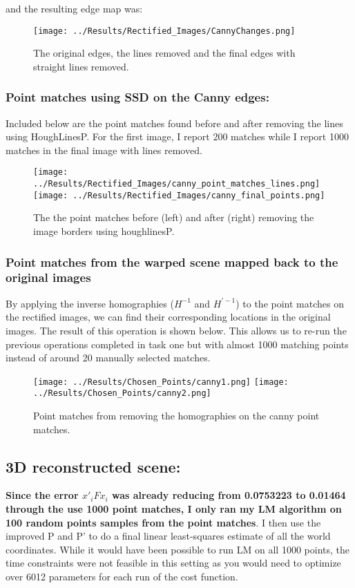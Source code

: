 \documentclass{article}
\begin{document}
and the resulting edge map was:
\begin{figure}[H]
    \centering
    \texttt{[image: ../Results/Rectified\_Images/CannyChanges.png]}
    \caption{The original edges, the lines removed and the final edges with straight lines removed.}
\end{figure}

\subsubsection{Point matches using SSD on the Canny edges:}
Included below are the point matches found before and after removing the lines using HoughLinesP. For the first image, I report 200 matches while I report 1000 matches in the final image with lines removed.
\begin{figure}[H]
    \centering
    \texttt{[image: ../Results/Rectified\_Images/canny\_point\_matches\_lines.png]}
    \texttt{[image: ../Results/Rectified\_Images/canny\_final\_points.png]}
    \caption{The the point matches before (left) and after (right) removing the image borders using houghlinesP.}
\end{figure}

\subsubsection{Point matches from the warped scene mapped back to the original images}
By applying the inverse homographies ($H^{-1}$ and $H^{'-1}$) to the point matches on the rectified images, we can find their corresponding locations in the original images. The result of this operation is shown below. This allows us to re-run the previous operations completed in task one but with almost 1000 matching points instead of around 20 manually selected matches.

\begin{figure}[H]
    \centering
    \texttt{[image: ../Results/Chosen\_Points/canny1.png]}
    \texttt{[image: ../Results/Chosen\_Points/canny2.png]}
    \caption{Point matches from removing the homographies on the canny point matches.}
\end{figure}

\subsection{3D reconstructed scene:}
\textbf{Since the error $x'_i F x_i$ was already reducing from 0.0753223 to 0.01464 through the use 1000 point matches, I only ran my LM algorithm on 100 random points samples from the point matches}. I then use the improved P and P' to do a final linear least-squares estimate of all the world coordinates. While it would have been possible to run LM on all 1000 points, the time constraints were not feasible in this setting as you would need to optimize over 6012 parameters for each run of the cost function.
\end{document}

